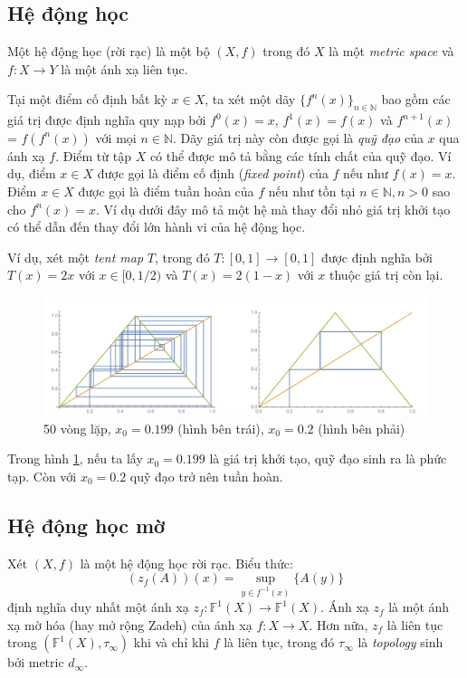 \documentclass[../report.tex]{subfiles}
\begin{document}
\subsection{Hệ động học}
Một hệ động học (rời rạc) là một bộ $(X, f)$ trong đó $X$ là một \textit{metric space}
và $f: X \rightarrow Y$ là một ánh xạ liên tục. 

Tại một điểm cố định bất kỳ $x \in X$, ta xét một dãy $\{ f^n(x) \}_{n \in \mathbb{N}}$
bao gồm các giá trị được định nghĩa quy nạp bởi $f^0(x) = x$, $f^1(x) = f(x)$
và $f^{n + 1} (x)$ = $f(f^n(x))$ với mọi $n \in \mathbb{N}$. Dãy giá trị này còn được gọi
là \textit{quỹ đạo} của $x$ qua ánh xạ $f$. Điểm từ tập $X$ có thể được mô tả bằng các 
tính chất của quỹ đạo. Ví dụ, điểm $x \in X$ được gọi là điểm cố định (\textit{fixed point})
của $f$ nếu như $f(x) = x$. Điểm $x \in X$ được gọi là điểm tuần hoàn của $f$ nếu như tồn tại 
$n \in \mathbb{N}, n > 0$ sao cho $f^n(x) = x$. Ví dụ dưới đây mô tả một hệ mà thay đổi 
nhỏ giá trị khởi tạo có thể dẫn đến thay đổi lớn hành vi của hệ động học. 

Ví dụ, xét một \textit{tent map} $T$, trong đó $T: [0, 1] \rightarrow [0, 1]$ được định 
nghĩa bởi $T(x) = 2x$ với $x \in [0, 1/2)$ và $T(x) = 2(1 - x)$ với 
$x$ thuộc giá trị còn lại. 

\begin{figure}[H]
\includegraphics[width=\textwidth]{figures/tent-map.png}
\caption{50 vòng lặp, $x_0 = 0.199$ (hình bên trái), $x_0 = 0.2$ (hình bên phải)}
\label{fig:1}
\end{figure}

Trong hình \ref{fig:1}, nếu ta lấy $x_0 = 0.199$ là giá trị khởi tạo, quỹ đạo 
sinh ra là phức tạp. Còn với $x_0 = 0.2$ quỹ đạo trở nên tuần hoàn. 

\subsection{Hệ động học mờ}
Xét $(X, f)$ là một hệ động học rời rạc. Biểu thức:
$$
(z_f(A))(x) = \sup_{y \in f^{-1} (x)} \{ A(y) \}
$$
định nghĩa duy nhất một ánh xạ $z_f: \mathbb{F}^1(X) \rightarrow \mathbb{F}^1(X)$. 
Ánh xạ $z_f$ là một ánh xạ mờ hóa (hay mở rộng Zadeh)
của ánh xạ $f: X \rightarrow X$. 
Hơn nữa, $z_f$ là liên tục trong $(\mathbb{F}^1(X), \tau_{\infty})$
khi và chỉ khi $f$ là liên tục, trong đó $\tau_{\infty}$ là \textit{topology}
sinh bởi metric $d_{\infty}$. 
\end{document}
